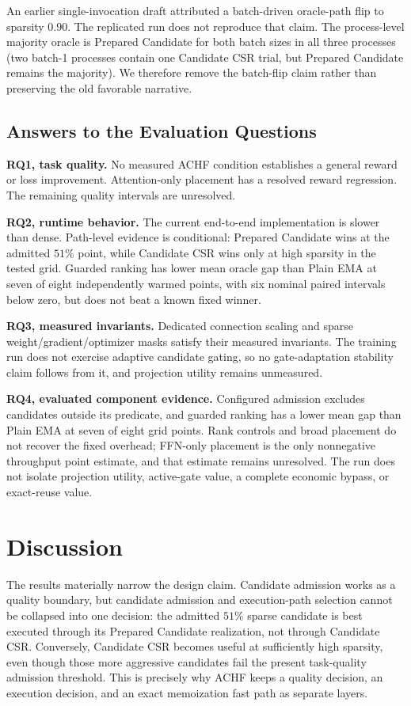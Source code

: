 \documentclass{article}
\begin{document}
An earlier single-invocation draft attributed a batch-driven oracle-path flip
to sparsity $0.90$. The replicated run does not reproduce that claim. The
process-level majority oracle is Prepared Candidate for both batch sizes in all
three processes (two batch-1 processes contain one Candidate CSR trial, but
Prepared Candidate remains the majority). We therefore remove the batch-flip
claim rather than preserving the old favorable narrative.

\subsection{Answers to the Evaluation Questions}

\textbf{RQ1, task quality.} No measured ACHF condition establishes a general
reward or loss improvement. Attention-only placement has a resolved reward
regression. The remaining quality intervals are unresolved.

\textbf{RQ2, runtime behavior.} The current end-to-end implementation is slower
than dense. Path-level evidence is conditional: Prepared Candidate wins at the
admitted $51\%$ point, while Candidate CSR wins only at high sparsity in the
tested grid. Guarded ranking has lower mean oracle gap than Plain EMA at seven
of eight independently warmed points, with six nominal paired intervals below
zero, but does not beat a known fixed winner.

\textbf{RQ3, measured invariants.} Dedicated connection scaling and sparse
weight/gradient/optimizer masks satisfy their measured invariants. The training
run does not exercise adaptive candidate gating, so no gate-adaptation
stability claim follows from it, and projection utility remains unmeasured.

\textbf{RQ4, evaluated component evidence.} Configured admission excludes
candidates outside its predicate, and guarded ranking has a lower mean gap than
Plain EMA at seven of eight grid points. Rank controls and broad placement do
not recover the fixed overhead; FFN-only placement is the only nonnegative
throughput point estimate, and that estimate remains unresolved. The run does
not isolate projection utility, active-gate value, a complete economic bypass,
or exact-reuse value.

\section{Discussion}

The results materially narrow the design claim. Candidate admission works as a
quality boundary, but candidate admission and execution-path selection cannot
be collapsed into one decision: the admitted $51\%$ sparse candidate is best
executed through its Prepared Candidate realization, not through Candidate CSR.
Conversely, Candidate CSR becomes useful at sufficiently high sparsity, even
though those more aggressive candidates fail the present task-quality
admission threshold. This is precisely why ACHF keeps a quality decision, an
execution decision, and an exact memoization fast path as separate layers.
\end{document}
